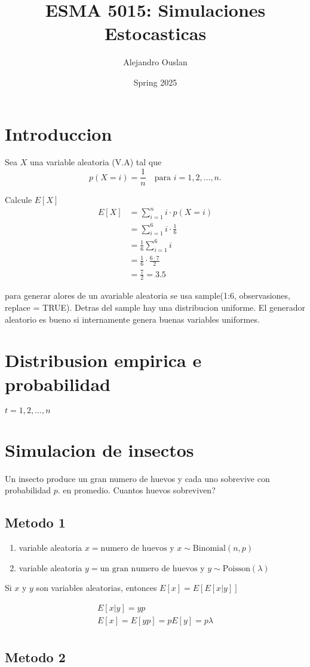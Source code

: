 \documentclass[10pt, oneside]{article}
\title{ESMA 5015: Simulaciones Estocasticas}
\author{Alejandro Ouslan}
\date{Spring 2025}
\begin{document}
\maketitle
\tableofcontents

\vspace{.25in}

\section{Introduccion}

Sea $X$ una variable aleatoria (V.A) tal que
$$ p(X = i) = \frac{1}{n} \quad \text{para } i = 1, 2, \ldots, n. $$

Calcule $E[X]$
\[
	\begin{split}
		E[X] & = \sum_{i=1}^{n} i \cdot p(X = i)       \\
		     & = \sum_{i=1}^{6} i \cdot \frac{1}{6}    \\
		     & = \frac{1}{6} \sum_{i=1}^{6} i          \\
		     & = \frac{1}{6} \cdot \frac{6 \cdot 7}{2} \\
		     & = \frac{7}{2} = 3.5
	\end{split}
\]

para generar alores de un avariable aleatoria se usa sample(1:6, observasiones, replace = TRUE). Detras del sample hay una distribucion uniforme. 
El generador aleatorio es bueno si internamente genera buenas variables uniformes.

\section{Distribusion empirica e probabilidad}

$t = 1, 2, \ldots, n$ 


\section{Simulacion de insectos}

Un insecto produce un gran numero de huevos y cada uno sobrevive con probabilidad $p$. en promedio. Cuantos huevos sobreviven?

\subsection{Metodo 1}

\begin{enumerate}
  \item variable aleatoria $x = \text{numero de huevos}$ y $x \sim \text{Binomial}(n, p)$
  \item variable aleatoria $y= \text{un gran numero de huevos}$ y $y \sim \text{Poisson}(\lambda)$
\end{enumerate}

Si $x$ y $y$ son variables aleatorias, entonces $E[x] = E[E[x|y]]$

\[
  \begin{split}
    E[x|y] = yp \\ 
    E[x] = E[yp] = pE[y] = p\lambda \\
  \end{split}
\]

\subsection{Metodo 2}
\end{document}
